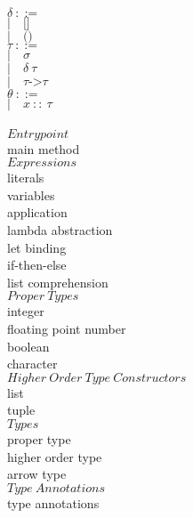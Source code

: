 ﻿\documentclass[5pt]{article}
\begin{document}
\begin{multicols}{2}
\noindent $\delta \ ::= $ \\
\hspace*{10mm} $| \quad \texttt{[]} $ \\
\hspace*{10mm} $| \quad \texttt{()} $ \\

\noindent $\tau \ ::= $ \\
\hspace*{10mm} $| \quad \sigma $ \\
\hspace*{10mm} $| \quad \delta \ \tau $ \\
\hspace*{10mm} $| \quad \tau \texttt{->} \tau $ \\

\noindent $\theta \ ::= $ \\
\hspace*{10mm} $| \quad x \ :: \  \tau $ \\
\columnbreak \\
$Entrypoint$ \\
main method \\

\noindent $Expressions$ \\
literals \\
variables \\
application \\
lambda abstraction \\
let binding \\
if-then-else \\
list comprehension \\

\noindent $Proper \ Types$ \\
integer \\
floating point number \\
boolean \\
character \\

\noindent $Higher \ Order \ Type \ Constructors$ \\
list \\
tuple \\

\noindent $Types$ \\
proper type \\
higher order type \\
arrow type \\

\noindent $Type \ Annotations$ \\
type annotations \\
\end{multicols}
\end{document}
